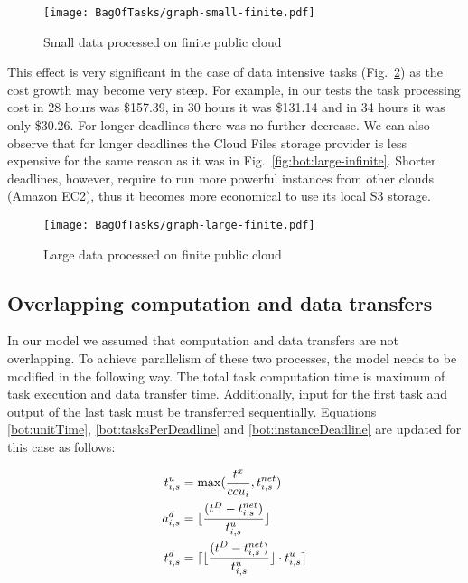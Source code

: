 {  \begin{figure}[tb]
     \centering
     \texttt{[image: BagOfTasks/graph-small-finite.pdf]}
     \caption{Small data processed on finite public
     cloud\label{fig:bot:small-finite}}
  \end{figure}

    
  This effect is very significant in the case of data intensive tasks (Fig.~\ref{fig:bot:large-finite}) as the cost growth may become very steep. For example, in our tests the task processing cost in 28 hours was \$157.39, in 30 hours it was \$131.14 and in 34 hours it was only \$30.26. For longer deadlines there was no further decrease. We can also observe that for longer deadlines the Cloud Files storage provider is less expensive for the same reason as it was in Fig.~\ref{fig:bot:large-infinite}. Shorter deadlines, however, require to run more powerful instances from other clouds (Amazon EC2), thus it becomes more economical to use its local S3 storage.
    
  \begin{figure}[tb]
     \centering
     \texttt{[image: BagOfTasks/graph-large-finite.pdf]}
     \caption{Large data processed on finite public
     cloud\label{fig:bot:large-finite}}
  \end{figure}  
  
\subsection{Overlapping computation and data transfers}
\label{sec:bot:overlapping}
  
  In our model we assumed that computation and data transfers are not overlapping. To achieve parallelism of these two processes, the model needs to be modified in the following way. The total task computation time is maximum of task execution and data transfer time. Additionally, input for the first task and output of the last task must be transferred sequentially. Equations \ref{bot:unitTime}, \ref{bot:tasksPerDeadline} and \ref{bot:instanceDeadline} are updated for this case as follows:
  
  \begin{align}
      t^u_{i,s} &= \max(\frac{t^x}{ccu_i}, t^{net}_{i,s})  \\    
      a^d_{i,s} &= \lfloor\frac{(t^D - t^{net}_{i,s})}{t^u_{i,s}}\rfloor \\         
      t^d_{i,s} &= \lceil\lfloor\frac{(t^D - t^{net}_{i,s})}{t^u_{i,s}} \rfloor \cdot t^u_{i,s} \rceil            
  \end{align}
  
}
